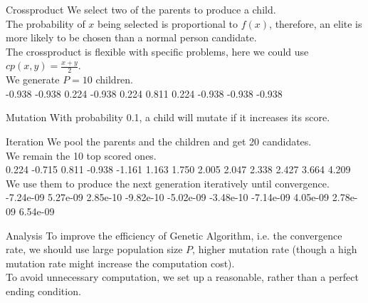 \documentclass[xcolor=dvipsnames]{beamer}
\begin{document}
\begin{frame}{Crossproduct}
We select two of the parents to produce a child.\\
The probability of $x$ being selected is proportional to $f(x)$, therefore, an elite is more likely to be chosen than a normal person candidate.\\
The crossproduct is flexible with specific problems, here we could use $cp(x,y)=\frac{x+y}{2}$.\\
We generate $P=10$ children.\\
-0.938 -0.938  0.224 -0.938  0.224  0.811  0.224 -0.938 -0.938 -0.938
\end{frame}
\begin{frame}{Mutation}
With probability 0.1, a child will mutate if it increases its score.\\
\end{frame}
\begin{frame}{Iteration}
We pool the parents and the children and get 20 candidates.\\
We remain the 10 top scored ones.\\
0.224 -0.715  0.811 -0.938 -1.161  1.163  1.750  2.005  2.047  2.338 2.427  3.664  4.209\\
We use them to produce the next generation iteratively until convergence.\\
-7.24e-09  5.27e-09  2.85e-10 -9.82e-10 -5.02e-09 -3.48e-10 -7.14e-09  4.05e-09  2.78e-09 6.54e-09\\
\end{frame}
\begin{frame}{Analysis}
To improve the efficiency of Genetic Algorithm, i.e. the convergence rate, we should use large population size $P$, higher mutation rate (though a high mutation rate might increase the computation cost).\\
To avoid unnecessary computation, we set up a reasonable, rather than a perfect ending condition.\\
\end{frame}
\end{document}
